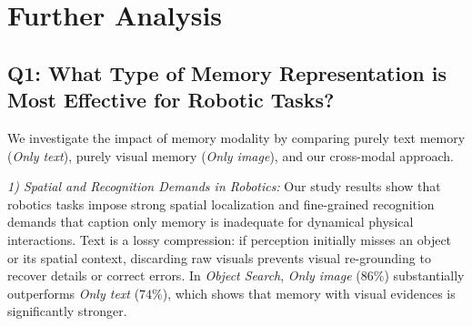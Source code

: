 


\section{Further Analysis}

\subsection{Q1: What Type of Memory Representation is Most Effective for Robotic Tasks?}
We investigate the impact of memory modality by comparing purely text memory (\textit{Only text}), purely visual memory (\textit{Only image}), and our cross-modal approach. 

\textit{1) Spatial and Recognition Demands in Robotics:}
Our study results show that robotics tasks impose strong spatial localization and fine-grained recognition demands that caption only memory is inadequate for dynamical physical interactions. Text is a lossy compression: if perception initially misses an object or its spatial context, discarding raw visuals prevents visual re-grounding to recover details or correct errors. In \textit{Object Search}, \textit{Only image} ($86\%$) substantially outperforms \textit{Only text} ($74\%$), which shows that memory with visual evidences is significantly stronger. 


